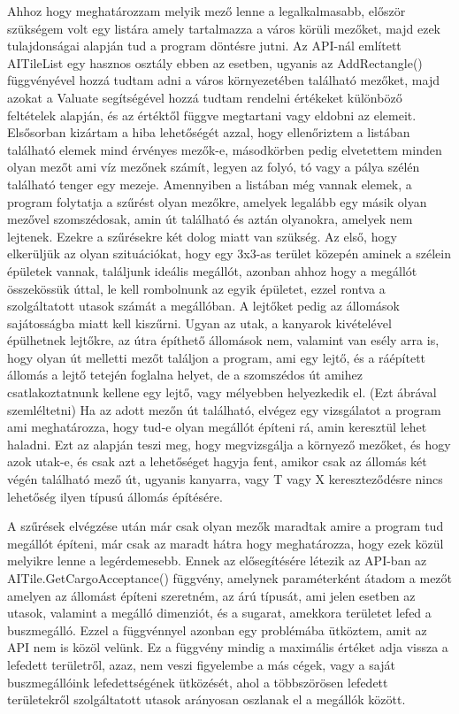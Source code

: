 Ahhoz hogy meghatározzam melyik mező lenne a legalkalmasabb, először szükségem volt egy listára amely tartalmazza a város körüli mezőket, majd ezek tulajdonságai alapján tud a program döntésre jutni. Az API-nál említett AITileList egy hasznos osztály ebben az esetben, ugyanis az AddRectangle() függvényével hozzá tudtam adni a város környezetében található mezőket, majd azokat a Valuate segítségével hozzá tudtam rendelni értékeket különböző feltételek alapján, és az értéktől függve megtartani vagy eldobni az elemeit. Elsősorban kizártam a hiba lehetőségét azzal, hogy ellenőriztem a listában található elemek mind érvényes mezők-e, másodkörben pedig elvetettem minden olyan mezőt ami víz mezőnek számít, legyen az folyó, tó vagy a pálya szélén található tenger egy mezeje.
Amennyiben a listában még vannak elemek, a program folytatja a szűrést olyan mezőkre, amelyek legalább egy másik olyan mezővel szomszédosak, amin út található és aztán olyanokra, amelyek nem lejtenek. Ezekre a szűrésekre két dolog miatt van szükség. Az első, hogy elkerüljük az olyan szituációkat, hogy egy 3x3-as terület közepén aminek a szélein épületek vannak, találjunk ideális megállót, azonban ahhoz hogy a megállót összekössük úttal, le kell rombolnunk az egyik épületet, ezzel rontva a szolgáltatott utasok számát a megállóban. A lejtőket pedig az állomások sajátosságba miatt kell kiszűrni. Ugyan az utak, a kanyarok kivételével épülhetnek lejtőkre, az útra építhető állomások nem, valamint van esély arra is, hogy olyan út melletti mezőt találjon a program, ami egy lejtő, és a ráépített állomás a lejtő tetején foglalna helyet, de a szomszédos út amihez csatlakoztatnunk kellene egy lejtő, vagy mélyebben helyezkedik el. (Ezt ábrával szemléltetni) Ha az adott mezőn út található, elvégez egy vizsgálatot a program ami meghatározza, hogy tud-e olyan megállót építeni rá, amin keresztül lehet haladni. Ezt az alapján teszi meg, hogy megvizsgálja a környező mezőket, és hogy azok utak-e, és csak azt a lehetőséget hagyja fent, amikor csak az állomás két végén található mező út, ugyanis kanyarra, vagy T vagy X kereszteződésre nincs lehetőség ilyen típusú állomás építésére.

A szűrések elvégzése után már csak olyan mezők maradtak amire a program tud megállót építeni, már csak az maradt hátra hogy meghatározza, hogy ezek közül melyikre lenne a legérdemesebb. Ennek az elősegítésére létezik az API-ban az AITile.GetCargoAcceptance() függvény, amelynek paraméterként átadom a mezőt amelyen az állomást építeni szeretném, az árú típusát, ami jelen esetben az utasok, valamint a megálló dimenziót, és a sugarat, amekkora területet lefed a buszmegálló. Ezzel a függvénnyel azonban egy problémába ütköztem, amit az API nem is közöl velünk. Ez a függvény mindig a maximális értéket adja vissza a lefedett területről, azaz, nem veszi figyelembe a más cégek, vagy a saját buszmegállóink lefedettségének ütközését, ahol a többszörösen lefedett területekről szolgáltatott utasok arányosan oszlanak el a megállók között.

